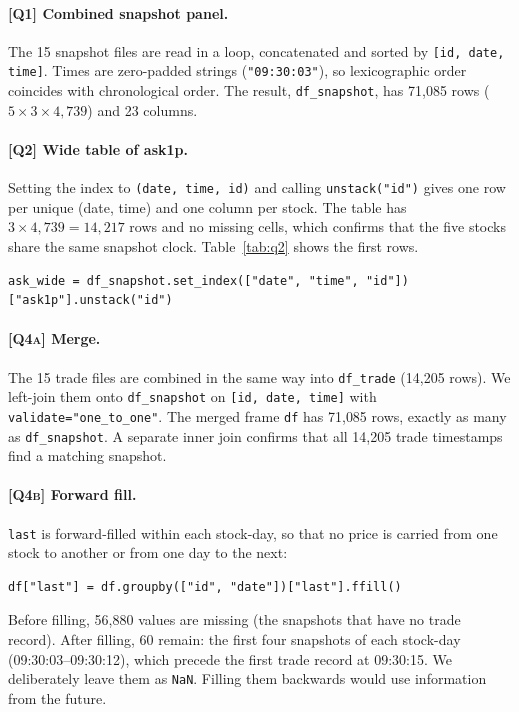 \documentclass[11pt,a4paper]{article}
\newcommand{\Q}[1]{\textsc{[Q#1]}}
\newcommand{\code}[1]{\texttt{#1}}
\begin{document}
\paragraph{\Q{1} Combined snapshot panel.} The 15 snapshot files are read in a loop, concatenated
and sorted by \code{[id, date, time]}. Times are zero-padded strings (\code{"09:30:03"}), so
lexicographic order coincides with chronological order. The result, \code{df\_snapshot}, has
71{,}085 rows ($5\times3\times4{,}739$) and 23 columns.

\paragraph{\Q{2} Wide table of ask1p.} Setting the index to \code{(date, time, id)} and calling
\code{unstack("id")} gives one row per unique (date, time) and one column per stock. The table
has $3\times4{,}739 = 14{,}217$ rows and no missing cells, which confirms that the five stocks share
the same snapshot clock. Table~\ref{tab:q2} shows the first rows.

\begin{lstlisting}
ask_wide = df_snapshot.set_index(["date", "time", "id"])["ask1p"].unstack("id")
\end{lstlisting}

\begin{table}[H]
\centering\small
\caption{\Q{2} First rows of the (date, time) $\times$ stock table of best ask prices.}
\label{tab:q2}

\end{table}

\paragraph{\Q{4a} Merge.} The 15 trade files are combined in the same way into \code{df\_trade}
(14{,}205 rows). We left-join them onto \code{df\_snapshot} on \code{[id, date, time]} with
\code{validate="one\_to\_one"}. The merged frame \code{df} has 71{,}085 rows, exactly as many as
\code{df\_snapshot}. A separate inner join confirms that all 14{,}205 trade timestamps find a
matching snapshot.

\paragraph{\Q{4b} Forward fill.} \code{last} is forward-filled within each stock-day, so that
no price is carried from one stock to another or from one day to the next:
\begin{lstlisting}
df["last"] = df.groupby(["id", "date"])["last"].ffill()
\end{lstlisting} Before filling, 56{,}880 values are missing (the snapshots that
have no trade record). After filling, 60 remain: the first four snapshots of each stock-day
(09:30:03--09:30:12), which precede the first trade record at 09:30:15. We deliberately leave them
as \code{NaN}. Filling them backwards would use information from the future.
\end{document}
